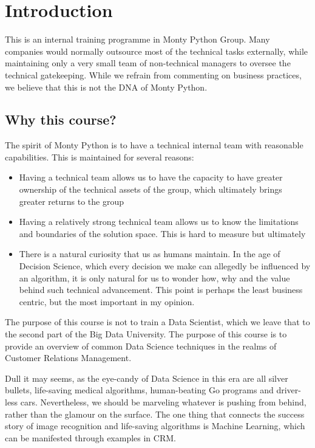 \section{Introduction}

This is an internal training programme in Monty Python Group.  Many companies would normally outsource most of the technical tasks externally, while maintaining only a very small team of non-technical managers to oversee the technical gatekeeping.  While we refrain from commenting on business practices, we believe that this is not the DNA of Monty Python.  

\subsection{Why this course?}

The spirit of Monty Python is to have a technical internal team with reasonable capabilities.  This is maintained for several reasons:

\begin{itemize}
\item Having a technical team allows us to have the capacity to have greater ownership of the technical assets of the group, which ultimately brings greater returns to the group
\item Having a relatively strong technical team allows us to know the limitations and boundaries of the solution space.  This is hard to measure but ultimately 
\item There is a natural curiosity that us as humans maintain.  In the age of Decision Science, which every decision we make can allegedly be influenced by an algorithm, it is only natural for us to wonder how, why and the value behind such technical advancement.  This point is perhaps the least business centric, but the most important in my opinion.  
\end{itemize}

The purpose of this course is not to train a Data Scientist, which we leave that to the second part of the Big Data University.  The purpose of this course is to provide an overview of common Data Science techniques in the realms of Customer Relations Management.  

Dull it may seems, as the eye-candy of Data Science in this era are all silver bullets, life-saving medical algorithms, human-beating Go programs and driver-less cars.  Nevertheless, we should be marveling whatever is pushing from behind, rather than the glamour on the surface.  The one thing that connects the success story of image recognition and life-saving algorithms is Machine Learning, which can be manifested through examples in CRM.  

